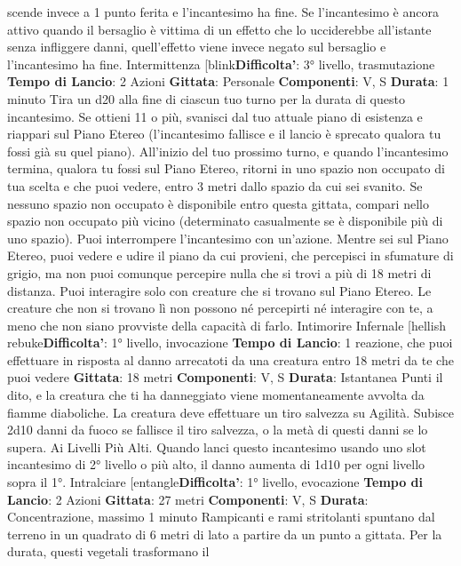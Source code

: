 \begin{multicols}{2}
scende invece a 1 punto ferita e l’incantesimo ha fine.
Se l’incantesimo è ancora attivo quando il bersaglio è
vittima di un effetto che lo ucciderebbe all’istante senza
infliggere danni, quell’effetto viene invece negato sul
bersaglio e l’incantesimo ha fine.
Intermittenza
[blink\textbf{Difficolta'}:
3° livello, trasmutazione
\textbf{Tempo di Lancio}: 2 Azioni
\textbf{Gittata}: Personale
\textbf{Componenti}: V, S
\textbf{Durata}: 1 minuto
Tira un d20 alla fine di ciascun tuo turno per la durata di
questo incantesimo. Se ottieni 11 o più, svanisci dal tuo
attuale piano di esistenza e riappari sul Piano Etereo
(l’incantesimo fallisce e il lancio è sprecato qualora tu
fossi già su quel piano). All’inizio del tuo prossimo
turno, e quando l’incantesimo termina, qualora tu fossi
sul Piano Etereo, ritorni in uno spazio non occupato di
tua scelta e che puoi vedere, entro 3 metri dallo spazio
da cui sei svanito. Se nessuno spazio non occupato è
disponibile entro questa gittata, compari nello spazio
non occupato più vicino (determinato casualmente se è
disponibile più di uno spazio). Puoi interrompere
l’incantesimo con un’azione.
Mentre sei sul Piano Etereo, puoi vedere e udire il
piano da cui provieni, che percepisci in sfumature di
grigio, ma non puoi comunque percepire nulla che si
trovi a più di 18 metri di distanza. Puoi interagire solo
con creature che si trovano sul Piano Etereo. Le
creature che non si trovano lì non possono né percepirti
né interagire con te, a meno che non siano provviste
della capacità di farlo.
Intimorire Infernale
[hellish rebuke\textbf{Difficolta'}:
1° livello, invocazione
\textbf{Tempo di Lancio}: 1 reazione, che puoi effettuare in
risposta al danno arrecatoti da una creatura entro 18
metri da te che puoi vedere
\textbf{Gittata}: 18 metri
\textbf{Componenti}: V, S
\textbf{Durata}: Istantanea
Punti il dito, e la creatura che ti ha danneggiato viene
momentaneamente avvolta da fiamme diaboliche. La
creatura deve effettuare un tiro salvezza su Agilità.
Subisce 2d10 danni da fuoco se fallisce il tiro salvezza,
o la metà di questi danni se lo supera.
Ai Livelli Più Alti. Quando lanci questo incantesimo
usando uno slot incantesimo di 2° livello o più alto, il
danno aumenta di 1d10 per ogni livello sopra il 1°.
Intralciare
[entangle\textbf{Difficolta'}:
1° livello, evocazione
\textbf{Tempo di Lancio}: 2 Azioni
\textbf{Gittata}: 27 metri
\textbf{Componenti}: V, S
\textbf{Durata}: Concentrazione, massimo 1 minuto
Rampicanti e rami stritolanti spuntano dal terreno in un
quadrato di 6 metri di lato a partire da un punto a
gittata. Per la durata, questi vegetali trasformano il

\end{multicols}

